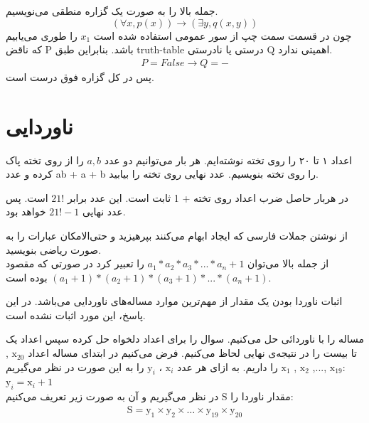 \documentclass[11pt,largemargins]{h2wp}
\begin{document}
 
 جمله بالا را به صورت یک گزاره منطقی می‌نویسیم.
  $$  (\forall x,p(x)) \rightarrow (\exists y, q(x,y)) $$
چون در قسمت سمت چپ از سور عمومی استفاده شده است 
$ x_1 $
را طوری می‌یابیم که ناقض P باشد. بنابراین طبق truth-table درستی یا نادرستی Q اهمیتی ندارد.
\begin{align*}
 P=False \rightarrow Q= -
\end{align*}
پس در کل گزاره فوق درست است.

 
 \chapter*{ناوردایی}
 
 \question
 
 
 اعداد ۱ تا ۲۰ را روی تخته نوشته‌ایم. هر بار می‌توانیم دو عدد $ a, b$ را از روی تخته پاک کرده و عدد ab + a + b را روی تخته بنویسیم. عدد نهایی روی تخته را بیابید.
 
 
 \solution
 
 
 در هربار حاصل ضرب اعداد روی تخته + 1 ثابت است. این عدد برابر  $ 21!$  است. پس عدد نهایی $21! - 1 $  خواهد بود.


 \notes
 
 
 از نوشتن جملات فارسی که ایجاد ابهام می‌کنند بپرهیزید و حتی‌الامکان عبارات را به صورت ریاضی بنویسید.
 \\
 از جمله بالا می‌توان 
 $ a_1 * a_2 * a_3 * ... * a_n + 1 $
 را تعبیر کرد در صورتی که مقصود 
 $ (a_1 + 1) * (a_2 + 1) * (a_3 + 1 ) * ... * (a_n + 1) $
 بوده است.
 
 اثبات ناوردا بودن یک مقدار از مهم‌ترین موارد مساله‌ها‌ی ناوردایی می‌باشد. در این پاسخ، این مورد اثبات نشده است.
 
 


  مساله را با ناوردائی حل می‌کنیم. سوال را برای اعداد دلخواه حل کرده سپس اعداد یک تا بیست را در نتیجه‌ی نهایی لحاظ می‌کنیم. فرض می‌کنیم در ابتدای مساله اعداد 
    $\mathrm{x}_{20}$
    ,
    $\mathrm{x}_{19}$
    ,...,
    $\mathrm{x}_2$
    ,
    $\mathrm{x}_1$
    را داریم. به ازای هر عدد
    $\mathrm{x}_{i}$
    ،
    $\mathrm{y}_{i}$
    را به این صورت در نظر می‌گیریم:      
    $\mathrm{y}_{i} = \mathrm{x}_{i} + 1$\\
    
    
    مقدار ناوردا را
    $\mathrm{S}$
    در نظر می‌گیریم و آن به صورت زیر تعریف می‌کنیم:
    \begin{align} \nonumber
        \mathrm{S} = \mathrm{y}_{1} \times \mathrm{y}_{2} \times \ldots \times \mathrm{y}_{19} \times \mathrm{y}_{20} \nonumber
    \end{align}
    
\end{document}
